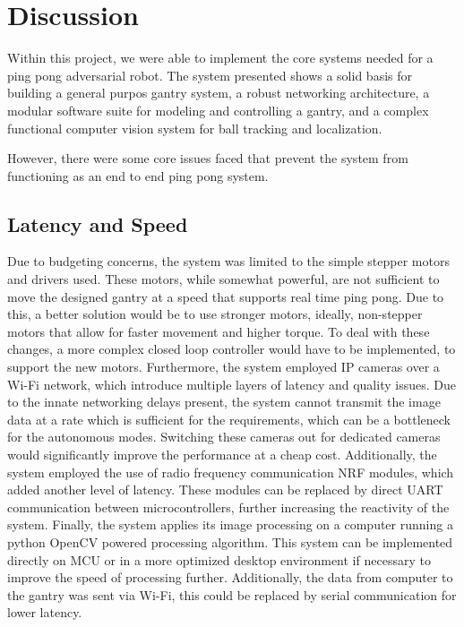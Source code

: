 \chapter{Discussion}
Within this project, we were able to implement the core systems needed for a ping pong adversarial robot. The system presented shows a solid basis for building a general purpos gantry system, a robust networking architecture, a modular software suite for modeling and controlling a gantry, and a complex functional computer vision system for ball tracking and localization.

 However, there were some core issues faced that prevent the system from functioning as an end to end ping pong system.

\section{Latency and Speed}
Due to budgeting concerns, the system was limited to the simple stepper motors and drivers used. These motors, while somewhat powerful, are not sufficient to move the designed gantry at a speed that supports real time ping pong. Due to this, a better solution would be to use stronger motors, ideally, non-stepper motors that allow for faster movement and higher torque. To deal with these changes, a more complex closed loop controller would have to be implemented, to support the new motors.
Furthermore, the system employed IP cameras over a Wi-Fi network, which introduce multiple layers of latency and quality issues. Due to the innate networking delays present, the system cannot transmit the image data at a rate which is sufficient for the requirements, which can be a bottleneck for the autonomous modes. Switching these cameras out for dedicated cameras would significantly improve the performance at a cheap cost.
Additionally, the system employed the use of radio frequency communication NRF modules, which added another level of latency. These modules can be replaced by direct UART communication between microcontrollers, further increasing the reactivity of the system.
Finally, the system applies its image processing on a computer running a python OpenCV powered processing algorithm. This system can be implemented directly on MCU or in a more optimized desktop environment if necessary to improve the speed of processing further. Additionally, the data from computer to the gantry was sent via Wi-Fi, this could be replaced by serial communication for lower latency.

